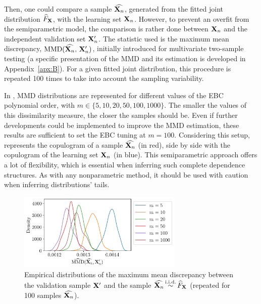 Then, one could compare a sample $\widehat{{\bf X}_n}$, generated from the fitted joint distribution $\widehat{F}_{\bf X}$, with the learning set ${\bf X}_n$. 
However, to prevent an overfit from the semiparametric model, the comparison is rather done between ${\bf X}_n$ and the independent validation set ${\bf X}_n'$. 
The statistic used is the maximum mean discrepancy, $\mathrm{MMD}(\widehat{{\bf X}_n}, \, {\bf X}_n')$, initially introduced for multivariate two-sample testing (a specific presentation of the MMD and its estimation is developed in Appendix~\ref{apx:B}). 
For a given fitted joint distribution, this procedure is repeated 100 times to take into account the sampling variability. 

In , MMD distributions are represented for different values of the EBC polynomial order, with $m\in\{5, 10, 20, 50, 100, 1000\}$. 
The smaller the values of this dissimilarity measure, the closer the samples should be. 
Even if further developments could be implemented to improve the MMD estimation, these results are sufficient to set the EBC tuning at $m=100$. 
Considering this setup,  represents the copulogram of a sample $\widehat{{\bf X}_n}$ (in red), side by side with the copulogram of the learning set ${\bf X}_n$ (in blue).  
This semiparametric approach offers a lot of flexibility, which is essential when inferring such complete dependence structures. 
As with any nonparametric method, it should be used with caution when inferring distributions' tails.  


\begin{figure}[h]
    \centering
    \includegraphics[width=0.7\textwidth]{../numerical_experiments/chapter3/figures/SB_MMD_goodness.png}
    \caption{Empirical distributions of the maximum mean discrepancy between the validation sample ${\bf X}'$ and the sample $\widehat{{\bf X}_n} \mathop{\sim}\limits^{\mathrm{i.i.d.}} \widehat{F}_{\bf X}$ (repeated for 100 samples $\widehat{{\bf X}_n}$).}
    \label{fig:sb_ebc_mmd}
\end{figure}


